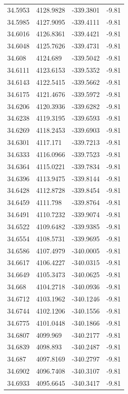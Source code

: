 \begin{table}[H]
\begin{tabular}{llll}
34.5953 & 4128.9828 & -339.3801 & -9.81 \\
34.5985 & 4127.9095 & -339.4111 & -9.81 \\
34.6016 & 4126.8361 & -339.4421 & -9.81 \\
34.6048 & 4125.7626 & -339.4731 & -9.81 \\
34.608 & 4124.689 & -339.5042 & -9.81 \\
34.6111 & 4123.6153 & -339.5352 & -9.81 \\
34.6143 & 4122.5415 & -339.5662 & -9.81 \\
34.6175 & 4121.4676 & -339.5972 & -9.81 \\
34.6206 & 4120.3936 & -339.6282 & -9.81 \\
34.6238 & 4119.3195 & -339.6593 & -9.81 \\
34.6269 & 4118.2453 & -339.6903 & -9.81 \\
34.6301 & 4117.171 & -339.7213 & -9.81 \\
34.6333 & 4116.0966 & -339.7523 & -9.81 \\
34.6364 & 4115.0221 & -339.7834 & -9.81 \\
34.6396 & 4113.9475 & -339.8144 & -9.81 \\
34.6428 & 4112.8728 & -339.8454 & -9.81 \\
34.6459 & 4111.798 & -339.8764 & -9.81 \\
34.6491 & 4110.7232 & -339.9074 & -9.81 \\
34.6522 & 4109.6482 & -339.9385 & -9.81 \\
34.6554 & 4108.5731 & -339.9695 & -9.81 \\
34.6586 & 4107.4979 & -340.0005 & -9.81 \\
34.6617 & 4106.4227 & -340.0315 & -9.81 \\
34.6649 & 4105.3473 & -340.0625 & -9.81 \\
34.668 & 4104.2718 & -340.0936 & -9.81 \\
34.6712 & 4103.1962 & -340.1246 & -9.81 \\
34.6744 & 4102.1206 & -340.1556 & -9.81 \\
34.6775 & 4101.0448 & -340.1866 & -9.81 \\
34.6807 & 4099.969 & -340.2177 & -9.81 \\
34.6839 & 4098.893 & -340.2487 & -9.81 \\
34.687 & 4097.8169 & -340.2797 & -9.81 \\
34.6902 & 4096.7408 & -340.3107 & -9.81 \\
34.6933 & 4095.6645 & -340.3417 & -9.81 \\

\end{tabular}
\end{table}
